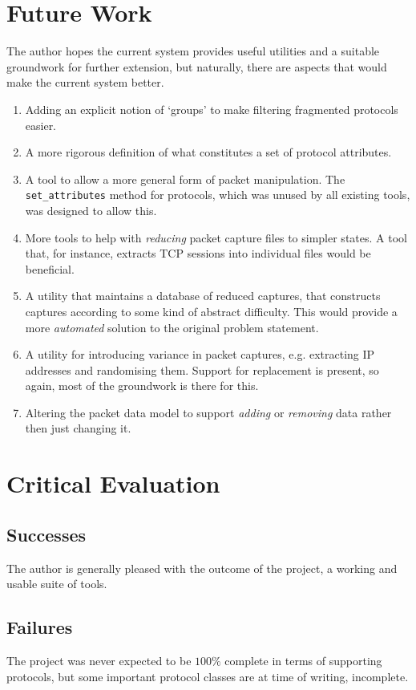 \documentclass[10pt,a4paper,notitlepage,twoside]{report}
\begin{document}
\chapter{Future Work}
The author hopes the current system provides useful utilities and a suitable groundwork for further extension, but naturally, there are aspects that would make the current system better.
\begin{enumerate}[label=\roman*)]
\item Adding an explicit notion of `groups' to make filtering fragmented protocols easier.
\item A more rigorous definition of what constitutes a set of protocol attributes.
\item A tool to allow a more general form of packet manipulation. The \texttt{set_attributes} method for protocols, which was unused by all existing tools, was designed to allow this.
\item More tools to help with \emph{reducing} packet capture files to simpler states. A tool that, for instance, extracts TCP sessions into individual files would be beneficial.
\item A utility that maintains a database of reduced captures, that constructs captures according to some kind of abstract difficulty. This would provide a more \emph{automated} solution to the original problem statement.
\item A utility for introducing variance in packet captures, e.g. extracting IP addresses and randomising them. Support for replacement is present, so again, most of the groundwork is there for this.
\item Altering the packet data model to support \emph{adding} or \emph{removing} data rather then just changing it.
\end{enumerate}

\chapter{Critical Evaluation}

\section{Successes}
The author is generally pleased with the outcome of the project, a working and usable suite of tools. 
\section{Failures}
The project was never expected to be $100\%$ complete in terms of supporting protocols, but some important protocol classes are at time of writing, incomplete.
\end{document}
